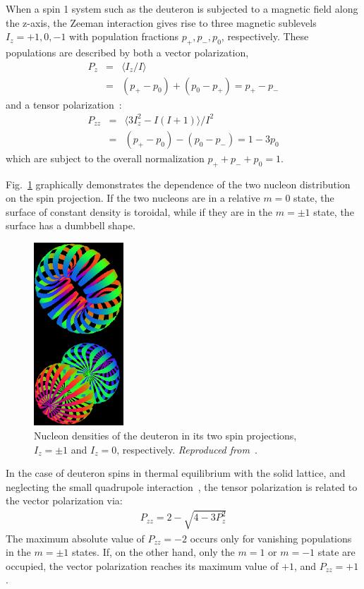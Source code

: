 When a  spin 1 system such as the deuteron is subjected to a magnetic field along the z-axis, the
Zeeman interaction gives rise to three magnetic sublevels $I_z = +1,0,-1$ with
population fractions $p_+,p_-, p_0$, respectively.
These populations are described by
both a vector  polarization,
%
\begin{eqnarray}
\nonumber
P_z &=&\langle I_z/I\rangle \\
    &=&(p_+ - p_0) + (p_0-p_+) = p_+ - p_-
\end{eqnarray}
and a tensor polarization~\cite{Meyer:1985dta}:
\begin{eqnarray}
\nonumber
P_{zz} &=& \langle 3 I_z^2 - I(I+1)\rangle/I^2   \\
&=&(p_+ - p_0) - (p_0-p_-) = 1 - 3 p_0
\end{eqnarray}
%
which are subject to the overall normalization $p_+ + p_- + p_0 = 1$.

Fig.~\ref{fig:deuteron} graphically demonstrates the dependence of the two nucleon distribution on the spin projection.  If the two nucleons are in a relative $m=0$ state, the surface of constant density is toroidal, while if they are in the $m=\pm 1$ state, the surface has a dumbbell shape.

\begin{figure}
\centering
\includegraphics[width=0.3\textwidth,angle=90]{figs/pic-v10-st16-1.eps}
\caption{\label{fig:deuteron}
Nucleon densities of the deuteron in its two spin projections, $I_z=\pm 1$ and $I_z=0$, respectively.
{\it Reproduced from~\cite{Carlson:1997qn,Forest:1996kp}}.
}
\end{figure}

In the case of deuteron spins in thermal equilibrium with the solid lattice, and neglecting the small quadrupole interaction~\cite{Meyer:1985dta}, the tensor polarization is related to  the vector polarization via:
\begin{eqnarray}
\label{TENSORVECTOR}
P_{zz}= 2 - \sqrt{4-3 P_z^2}
\end{eqnarray}
The maximum absolute value of $P_{zz}=-2$  occurs only for vanishing populations in the $m=\pm 1$ states.
If, on the other hand, only the $m=1$ or $m=-1$ state are occupied, the vector polarization reaches its maximum value of $+1$, and $P_{zz}=+1$.  
